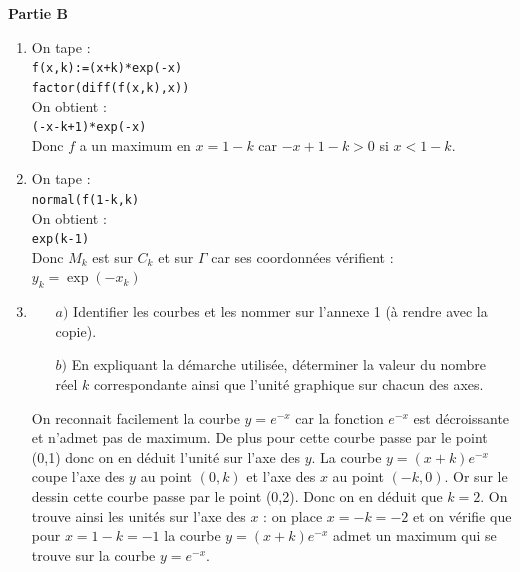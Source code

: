 \documentclass[a4paper,11pt]{book}
\begin{document}
{\bf Partie B}
\begin{enumerate}
\item On tape :\\
{\tt f(x,k):=(x+k)*exp(-x)}\\
{\tt factor(diff(f(x,k),x))}\\
On obtient :\\
{\tt (-x-k+1)*exp(-x)}\\
Donc $f$ a un maximum en $x=1-k$ car $-x+1-k>0$ si $x<1-k$.
\item On tape :\\
{\tt normal(f(1-k,k)}\\
On obtient :\\
{\tt exp(k-1)}\\
Donc $M_k$ est sur $C_k$ et sur $\Gamma$ car ses coordonn\'ees v\'erifient :\\
$y_k=\exp(-x_k)$
\item
\begin{itemize}
\item[$a)$] Identifier les courbes et les nommer sur l'annexe 1 
(\`a rendre avec la copie).
\item[$b)$] En expliquant la d\'emarche utilis\'ee, d\'eterminer la 
valeur du nombre r\'eel $k$ correspondante ainsi que l'unit\'e graphique sur 
chacun des axes.
\end{itemize}
On reconnait facilement la courbe $y=e^{-x}$ car la fonction $e^{-x}$ est 
d\'ecroissante et n'admet pas de maximum. De plus pour cette courbe passe par 
le point (0,1) donc on en d\'eduit l'unit\'e sur l'axe des $y$.
La courbe $y=(x+k)e^{-x}$ coupe l'axe des $y$ au point $(0,k)$ et l'axe des $x$ 
au point $(-k,0)$. 
Or sur le dessin cette courbe passe par le point (0,2).
Donc on en d\'eduit que $k=2$. On trouve ainsi les unit\'es sur l'axe des $x$ :
on place $x=-k=-2$ et on v\'erifie que pour $x=1-k=-1$ la courbe $y=(x+k)e^{-x}$
admet un maximum qui se trouve sur la courbe $y=e^{-x}$.
 

\end{enumerate}
\end{document}
